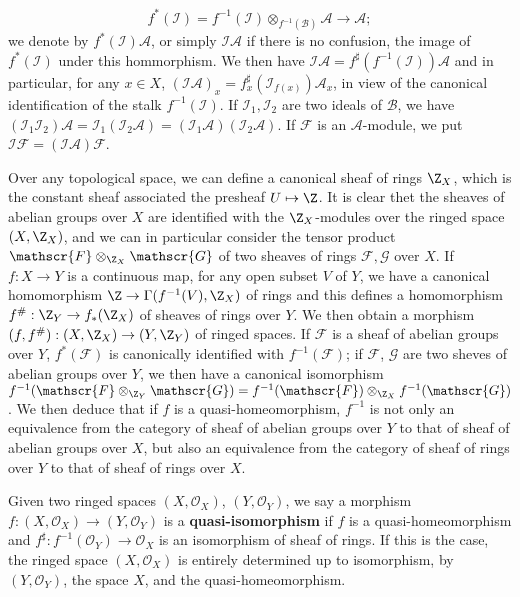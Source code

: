 \[f^*(\mathscr{I})=f^{-1}(\mathscr{I})\otimes_{f^{-1}(\mathscr{B})}\mathscr{A}\to\mathscr{A};\]
we denote by $f^*(\mathscr{I})\mathscr{A}$, or simply $\mathscr{I}\mathscr{A}$ if there is no confusion, the image of $f^*(\mathscr{I})$ under this hommorphism. We then have $\mathscr{I}\mathscr{A}=f^{\sharp}(f^{-1}(\mathscr{I}))\mathscr{A}$ and in particular, for any $x\in X$, $(\mathscr{I}\mathscr{A})_x=f^{\sharp}_x(\mathscr{I}_{f(x)})\mathscr{A}_x$, in view of the canonical identification of the stalk $f^{-1}(\mathscr{I})$. If $\mathscr{I}_1,\mathscr{I}_2$ are two ideals of $\mathscr{B}$, we have $(\mathscr{I}_1\mathscr{I}_2)\mathscr{A}=\mathscr{I}_1(\mathscr{I}_2\mathscr{A})=(\mathscr{I}_1\mathscr{A})(\mathscr{I}_2\mathscr{A})$. If $\mathscr{F}$ is an $\mathscr{A}$-module, we put $\mathscr{I}\mathscr{F}=(\mathscr{I}\mathscr{A})\mathscr{F}$.
\begin{remark}
Over any topological space, we can define a canonical sheaf of rings $\Z_X$, which is the constant sheaf associated the presheaf $U\mapsto\Z$. It is clear thet the sheaves of abelian groups over $X$ are identified with the $\Z_X$-modules over the ringed space $(X,\Z_X)$, and we can in particular consider the tensor product $\mathscr{F}\otimes_{\Z_X}\mathscr{G}$ of two sheaves of rings $\mathscr{F},\mathscr{G}$ over $X$. If $f:X\to Y$ is a continuous map, for any open subset $V$ of $Y$, we have a canonical homomorphism $\Z\to\Gamma(f^{-1}(V),\Z_X)$ of rings and this defines a homomorphism $f^{\#}:\Z_Y\to f_*(\Z_X)$ of sheaves of rings over $Y$. We then obtain a morphism $(f,f^{\#}):(X,\Z_X)\to(Y,\Z_Y)$ of ringed spaces. If $\mathscr{F}$ is a sheaf of abelian groups over $Y$, $f^*(\mathscr{F})$ is canonically identified with $f^{-1}(\mathscr{F})$; if $\mathscr{F}$, $\mathscr{G}$ are two sheves of abelian groups over $Y$, we then have a canonical isomorphism $f^{-1}(\mathscr{F}\otimes_{\Z_Y}\mathscr{G})=f^{-1}(\mathscr{F})\otimes_{\Z_X}f^{-1}(\mathscr{G})$. We then deduce that if $f$ is a quasi-homeomorphism, $f^{-1}$ is not only an equivalence from the category of sheaf of abelian groups over $Y$ to that of sheaf of abelian groups over $X$, but also an equivalence from the category of sheaf of rings over $Y$ to that of sheaf of rings over $X$.\par
Given two ringed spaces $(X,\mathscr{O}_X)$, $(Y,\mathscr{O}_Y)$, we say a morphism $f:(X,\mathscr{O}_X)\to(Y,\mathscr{O}_Y)$ is a \textbf{quasi-isomorphism} if $f$ is a quasi-homeomorphism and $f^{\sharp}:f^{-1}(\mathscr{O}_Y)\to\mathscr{O}_X$ is an isomorphism of sheaf of rings. If this is the case, the ringed space $(X,\mathscr{O}_X)$ is entirely determined up to isomorphism, by $(Y,\mathscr{O}_Y)$, the space $X$, and the quasi-homeomorphism.\par

\end{remark}
